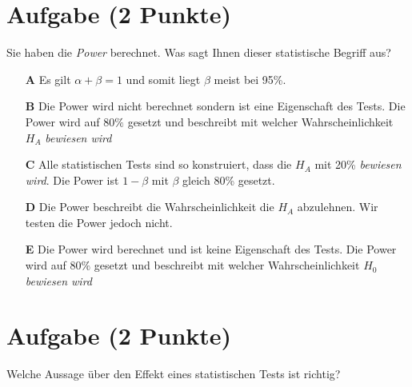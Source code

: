 \documentclass[a4paper, 9pt]{scrartcl}\usepackage[]{graphicx}\usepackage[]{xcolor}
\begin{document}
\section{Aufgabe \hfill (2 Punkte)}



Sie haben die \textit{Power} berechnet. Was sagt Ihnen dieser statistische Begriff aus?



\begin{enumerate}
\item [\textbf{A} \msquare] Es gilt $\alpha + \beta = 1$ und somit liegt $\beta$ meist bei 95\%.
\item [\textbf{B} \msquare] Die Power wird nicht berechnet sondern ist eine Eigenschaft des Tests. Die Power wird auf $80\%$ gesetzt und beschreibt mit welcher Wahrscheinlichkeit $H_A$ \textit{bewiesen wird}
\item [\textbf{C} \msquare] Alle statistischen Tests sind so konstruiert, dass die $H_A$ mit 20\% \textit{bewiesen wird}. Die Power ist $1-\beta$ mit $\beta$ gleich 80\% gesetzt.
\item [\textbf{D} \msquare] Die Power beschreibt die Wahrscheinlichkeit die $H_A$ abzulehnen. Wir testen die Power jedoch nicht.
\item [\textbf{E} \msquare] Die Power wird berechnet und ist keine Eigenschaft des Tests. Die Power wird auf $80\%$ gesetzt und beschreibt mit welcher Wahrscheinlichkeit $H_0$ \textit{bewiesen wird}
\end{enumerate}

\section{Aufgabe \hfill (2 Punkte)}



Welche Aussage über den Effekt eines statistischen Tests ist richtig?
\end{document}
